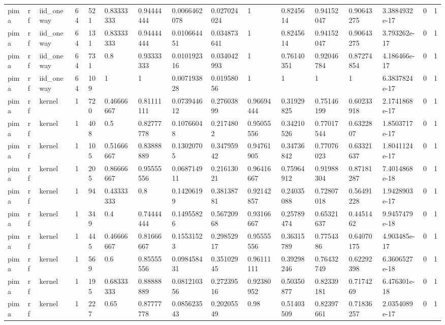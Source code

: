 \begin{tabular}{llllllllllllllll}
pima & rf & iid\_oneway & 64 & 521 & 0.83333333 & 0.94444444 & 0.0066462078 & 0.027024024 & 1 & 0.8245614 & 0.94152047 & 0.90643275 & 3.3884932e-17 & 0 & 1 \\
pima & rf & iid\_oneway & 64 & 131 & 0.83333333 & 0.94444444 & 0.010664451 & 0.034873641 & 1 & 0.8245614 & 0.94152047 & 0.90643275 & 3.793262e-17 & 0 & 1 \\
pima & rf & iid\_oneway & 64 & 731 & 0.8 & 0.93333333 & 0.010192316 & 0.034042993 & 1 & 0.76140351 & 0.92046784 & 0.87274854 & 4.186466e-17 & 0 & 1 \\
pima & rf & iid\_oneway & 64 & 109 & 1 & 1 & 0.007193828 & 0.01958056 & 1 & 1 & 1 & 1 & 6.3837824e-17 & 0 & 1 \\
pima & rf & kernel & 1 & 720 & 0.46666667 & 0.81111111 & 0.073944612 & 0.27603899 & 0.96694444 & 0.31929825 & 0.75146199 & 0.60233918 & 2.1741868e-17 & 0 & 1 \\
pima & rf & kernel & 1 & 408 & 0.5 & 0.82777778 & 0.10766048 & 0.2174802 & 0.95055556 & 0.34210526 & 0.77017544 & 0.6322807 & 1.8503717e-17 & 0 & 1 \\
pima & rf & kernel & 1 & 105 & 0.51666667 & 0.83888889 & 0.13020705 & 0.34795942 & 0.94761905 & 0.34736842 & 0.77076023 & 0.63321637 & 1.8041124e-17 & 0 & 1 \\
pima & rf & kernel & 1 & 205 & 0.86666667 & 0.95555556 & 0.068714911 & 0.21613021 & 0.96416667 & 0.75964912 & 0.91988304 & 0.87181287 & 7.4014868e-18 & 0 & 1 \\
pima & rf & kernel & 1 & 94 & 0.43333333 & 0.8 & 0.14206199 & 0.38138781 & 0.92142857 & 0.24035088 & 0.72807018 & 0.56491228 & 1.9428903e-17 & 0 & 1 \\
pima & rf & kernel & 1 & 349 & 0.4 & 0.74444444 & 0.14955826 & 0.56720968 & 0.93166667 & 0.25789474 & 0.65321637 & 0.4451462 & 9.9457479e-18 & 0 & 1 \\
pima & rf & kernel & 1 & 445 & 0.46666667 & 0.81666667 & 0.15531523 & 0.29852917 & 0.95555556 & 0.36315789 & 0.7754386 & 0.64070175 & 4.903485e-17 & 0 & 1 \\
pima & rf & kernel & 1 & 569 & 0.6 & 0.85555556 & 0.098458431 & 0.35102945 & 0.96111111 & 0.39298246 & 0.76432749 & 0.62292398 & 6.3606527e-18 & 0 & 1 \\
pima & rf & kernel & 1 & 195 & 0.68333333 & 0.88888889 & 0.081210356 & 0.27239516 & 0.92380952 & 0.50350877 & 0.82339181 & 0.7174269 & 6.476301e-18 & 0 & 1 \\
pima & rf & kernel & 1 & 227 & 0.65 & 0.87777778 & 0.085623543 & 0.20205549 & 0.98 & 0.51403509 & 0.82397661 & 0.71836257 & 2.0354089e-17 & 0 & 1 \\

\end{tabular}
